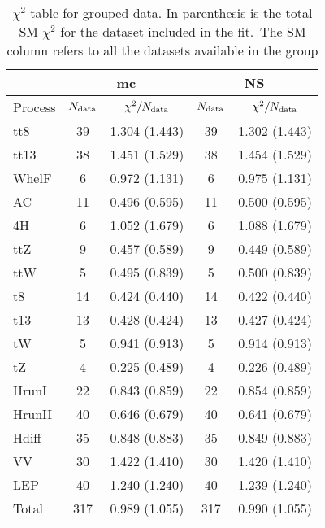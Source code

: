 \documentclass{article}
\begin{document}
\begin{table}[H]
\centering
\begin{tabular}{|l|c|c|c|c|}
\hline
& \multicolumn{2}{c|}{mc} & \multicolumn{2}{c|}{NS} \\ \hline
Process  & $N_{\rm data}$ & $\chi^2/N_{\rm data}$ & $N_{\rm data}$ & $\chi^2/N_{\rm data}$\\ \hline
tt8 & 39 & 1.304 (1.443) & 39 & 1.302 (1.443) \\ \hline
tt13 & 38 & 1.451 (1.529) & 38 & 1.454 (1.529) \\ \hline
WhelF & 6 & 0.972 (1.131) & 6 & 0.975 (1.131) \\ \hline
AC & 11 & 0.496 (0.595) & 11 & 0.500 (0.595) \\ \hline
4H & 6 & 1.052 (1.679) & 6 & 1.088 (1.679) \\ \hline
ttZ & 9 & 0.457 (0.589) & 9 & 0.449 (0.589) \\ \hline
ttW & 5 & 0.495 (0.839) & 5 & 0.500 (0.839) \\ \hline
t8 & 14 & 0.424 (0.440) & 14 & 0.422 (0.440) \\ \hline
t13 & 13 & 0.428 (0.424) & 13 & 0.427 (0.424) \\ \hline
tW & 5 & 0.941 (0.913) & 5 & 0.914 (0.913) \\ \hline
tZ & 4 & 0.225 (0.489) & 4 & 0.226 (0.489) \\ \hline
HrunI & 22 & 0.843 (0.859) & 22 & 0.854 (0.859) \\ \hline
HrunII & 40 & 0.646 (0.679) & 40 & 0.641 (0.679) \\ \hline
Hdiff & 35 & 0.848 (0.883) & 35 & 0.849 (0.883) \\ \hline
VV & 30 & 1.422 (1.410) & 30 & 1.420 (1.410) \\ \hline
LEP & 40 & 1.240 (1.240) & 40 & 1.239 (1.240) \\ \hline
 \hline Total & 317 & 0.989 (1.055) & 317 & 0.990 (1.055) \\ \hline
\end{tabular}
\caption{$\chi^2$ table for grouped data. In parenthesis is the total SM $\chi^2$ for the dataset included in the fit.\
                    The SM column refers to all the datasets available in the group}
\end{table}
\end{document}
